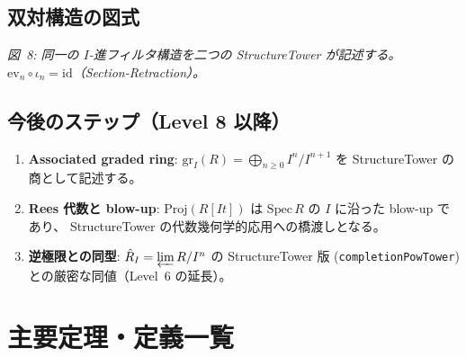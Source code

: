 \documentclass[a4paper,12pt]{article}
\theoremstyle{definition}
\theoremstyle{plain}
\newcommand{\figcap}[1]{\begin{center}\small\textit{#1}\end{center}}
\newcommand{\Ipower}[1]{I^{#1}}
\newcommand{\reesdeg}{\mathrm{reesDegreeTower}}
\newcommand{\idealpow}{\mathrm{idealPowTower}}
\newcommand{\STower}{\mathrm{StructureTower}}
\begin{document}
\subsection{双対構造の図式}

\begin{center}
\end{center}
\figcap{図~8: 同一の $I$-進フィルタ構造を二つの StructureTower が記述する。$\mathrm{ev}_n \circ \iota_n = \mathrm{id}$（Section-Retraction）。}

\subsection{今後のステップ（Level 8 以降）}

\begin{enumerate}[label=\textbf{候補\arabic*.},leftmargin=*]
  \item \textbf{Associated graded ring}:
    $\mathrm{gr}_I(R) = \bigoplus_{n \geq 0} I^n/I^{n+1}$ を
    StructureTower の商として記述する。
  \item \textbf{Rees 代数と blow-up}:
    $\mathrm{Proj}(R[It])$ は $\mathrm{Spec}\,R$ の $I$ に沿った blow-up であり、
    StructureTower の代数幾何学的応用への橋渡しとなる。
  \item \textbf{逆極限との同型}:
    $\hat{R}_I = \varprojlim R/\Ipower{n}$ の StructureTower 版
    (\texttt{completionPowTower}) との厳密な同値（Level~6 の延長）。
\end{enumerate}

\appendix
\section{主要定理・定義一覧}
\end{document}
